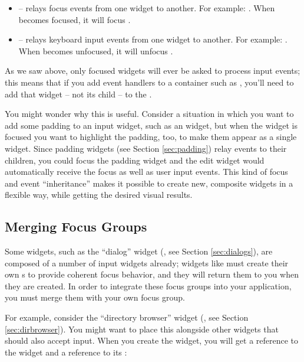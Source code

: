 \begin{itemize}
\item {} -- relays focus events from one widget to
  another.  For example: .
  When  becomes focused, it will focus .
\item {} -- relays keyboard input events from one
  widget to another.  For example: .  When  becomes unfocused, it will unfocus
  .
\end{itemize}

As we saw above, only focused widgets will ever be asked to process
input events; this means that if you add event handlers to a container
such as , you'll need to add that widget -- not its child
-- to the .

You might wonder why this is useful.  Consider a situation in which
you want to add some padding to an input widget, such as an 
widget, but when the  widget is focused you want to highlight
the padding, too, to make them appear as a single widget.  Since
padding widgets (see Section \ref{sec:padding}) relay events to their
children, you could focus the padding widget and the edit widget would
automatically receive the focus as well as user input events.  This
kind of focus and event ``inheritance'' makes it possible to create
new, composite widgets in a flexible way, while getting the desired
visual results.

\subsection{Merging Focus Groups}
\label{sec:merging_focus_groups}

Some widgets, such as the ``dialog'' widget (, see Section
\ref{sec:dialogs}), are composed of a number of input widgets already;
widgets like  must create their own s to
provide coherent focus behavior, and they will return them to you when
they are created.  In order to integrate these focus groups into your
application, you must merge them with your own focus group.

For example, consider the ``directory browser'' widget
(, see Section \ref{sec:dirbrowser}).  You might want
to place this alongside other widgets that should also accept input.
When you create the  widget, you will get a reference
to the widget and a reference to its :

